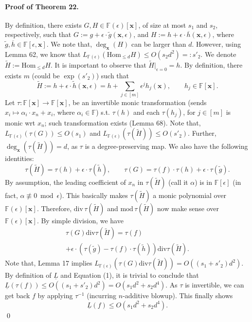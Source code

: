 \paragraph{Proof of Theorem 22.} By definition, there exists $G,H\in\mathbb F(\epsilon)[\mathbf x]$, of size at most $s_1$ and $s_2$, respectively, such that $G:=g+\epsilon\cdot\widetilde g(\mathbf x,\epsilon)$, and $H:=h+\epsilon\cdot\overline h(\mathbf x,\epsilon)$, where $\widetilde g,\overline h\in\mathbb F[\epsilon,\mathbf x]$. We note that, $\deg_{\mathbf x}(H)$ can be larger than $d$. However, using Lemma 62, we know that $L_{\mathbb F(\epsilon)}(\mathrm{Hom}_{\le d}H)\le O(s_2d^2)=:s'_2$.
We denote $\widetilde H:=\mathrm{Hom}_{\le d}H$. It is important to observe that $\widetilde H|_{\epsilon=0}=h$. By definition, there exists $m$ (could be $\exp(s'_2)$) such that
\[\widetilde H:=h+\epsilon\cdot\widetilde h(\mathbf x,\epsilon)=h+\sum_{j\in[m]}\epsilon^jh_j(\mathbf x),\qquad h_j\in\mathbb F[\mathbf x].\]
Let $\tau:\mathbb F[\mathbf x]\longrightarrow\mathbb F[\mathbf x]$, be an invertible monic transformation (sends $x_i\mapsto\alpha_i\cdot x_n+x_i$, where $\alpha_i\in\mathbb F$) s.t. $\tau(h)$ and each $\tau(h_j)$, for $j\in[m]$ is monic wrt $x_n$; such transformation exists (Lemma 68). Note that, $L_{\mathbb F(\epsilon)}(\tau(G))\le O(s_1)$ and $L_{\mathbb F(\epsilon)}(\tau(\widetilde H))\le O(s'_2)$. Further, $\deg_{\mathbf x}(\tau(\widetilde H))=d$, as $\tau$ is a degree-preserving map. We also have the following identities:
\[\tau(\widetilde H)=\tau(h)+\epsilon\cdot\tau(\widetilde h),\qquad\tau(G)=\tau(f)\cdot\tau(h)+\epsilon\cdot\tau(\widetilde g).\]
By assumption, the leading coefficient of $x_n$ in $\tau(\widetilde H)$ (call it $\alpha$) is in $\mathbb F[\epsilon]$ (in fact, $\alpha\not\equiv0\bmod\epsilon$). This basically makes $\tau(\widetilde H)$ a monic polynomial over $\mathbb F(\epsilon)[\mathbf x]$. Therefore, $\mathrm{div}\,\tau(\widetilde H)$ and $\mathrm{mod}\,\tau(\widetilde H)$ now make sense over $\mathbb F(\epsilon)[\mathbf x]$. By simple division, we have
\begin{multline*}\tau(G)\mathbin{\mathrm{div}}\tau(\widetilde H)=\tau(f)\\+\epsilon\cdot(\tau(\widetilde g)-\tau(f)\cdot\tau(\widetilde h))\mathbin{\mathrm{div}}\tau(\widetilde H).\tag{1}\end{multline*}
Note that, Lemma 17 implies $L_{\mathbb F(\epsilon)}(\tau(G)\mathbin{\mathrm{div}}\tau(\widetilde H))=O((s_1+s'_2)d^2)$. By definition of $\underline L$ and Equation (1), it is trivial to conclude that $\underline L(\tau(f))\le O((s_1+s'_2)d^2)=O(s_1d^2+s_2d^4)$. As $\tau$ is invertible, we can get back $f$ by applying $\tau^{-1}$ (incurring $n$-additive blowup). This finally shows
\[\underline L(f)\le O(s_1d^2+s_2d^4).\]\qed

